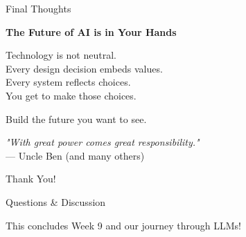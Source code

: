 \documentclass[aspectratio=169]{beamer}
\begin{document}
\begin{frame}{Final Thoughts 💭}
\begin{center}
\Large{\textbf{The Future of AI is in Your Hands}}

\vspace{0.5cm}

\normalsize{
Technology is not neutral. \\
\vspace{0.3cm}
Every design decision embeds values. \\
\vspace{0.3cm}
Every system reflects choices. \\
\vspace{0.3cm}
You get to make those choices.
}

\vspace{0.5cm}

\large{Build the future you want to see. 🌟}

\vspace{0.5cm}

\normalsize{
\textit{"With great power comes great responsibility."} \\
— Uncle Ben (and many others)
}
\end{center}
\end{frame}

\begin{frame}
\begin{center}
\Huge{Thank You! 🙏}

\vspace{0.5cm}

\Large{Questions \& Discussion 💬}

\vspace{2cm}

\normalsize{
This concludes Week 9 and our journey through LLMs!
}
\end{center}
\end{frame}
\end{document}
